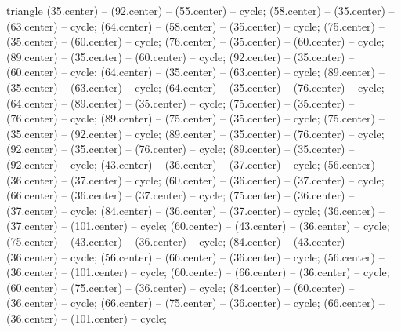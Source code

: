 \begin{pgfonlayer}{triangle}
 (35.center) -- (92.center) -- (55.center) -- cycle; 
 (58.center) -- (35.center) -- (63.center) -- cycle; 
 (64.center) -- (58.center) -- (35.center) -- cycle; 
 (75.center) -- (35.center) -- (60.center) -- cycle; 
 (76.center) -- (35.center) -- (60.center) -- cycle; 
 (89.center) -- (35.center) -- (60.center) -- cycle; 
 (92.center) -- (35.center) -- (60.center) -- cycle; 
 (64.center) -- (35.center) -- (63.center) -- cycle; 
 (89.center) -- (35.center) -- (63.center) -- cycle; 
 (64.center) -- (35.center) -- (76.center) -- cycle; 
 (64.center) -- (89.center) -- (35.center) -- cycle; 
 (75.center) -- (35.center) -- (76.center) -- cycle; 
 (89.center) -- (75.center) -- (35.center) -- cycle; 
 (75.center) -- (35.center) -- (92.center) -- cycle; 
 (89.center) -- (35.center) -- (76.center) -- cycle; 
 (92.center) -- (35.center) -- (76.center) -- cycle; 
 (89.center) -- (35.center) -- (92.center) -- cycle; 
 (43.center) -- (36.center) -- (37.center) -- cycle; 
 (56.center) -- (36.center) -- (37.center) -- cycle; 
 (60.center) -- (36.center) -- (37.center) -- cycle; 
 (66.center) -- (36.center) -- (37.center) -- cycle; 
 (75.center) -- (36.center) -- (37.center) -- cycle; 
 (84.center) -- (36.center) -- (37.center) -- cycle; 
 (36.center) -- (37.center) -- (101.center) -- cycle; 
 (60.center) -- (43.center) -- (36.center) -- cycle; 
 (75.center) -- (43.center) -- (36.center) -- cycle; 
 (84.center) -- (43.center) -- (36.center) -- cycle; 
 (56.center) -- (66.center) -- (36.center) -- cycle; 
 (56.center) -- (36.center) -- (101.center) -- cycle; 
 (60.center) -- (66.center) -- (36.center) -- cycle; 
 (60.center) -- (75.center) -- (36.center) -- cycle; 
 (84.center) -- (60.center) -- (36.center) -- cycle; 
 (66.center) -- (75.center) -- (36.center) -- cycle; 
 (66.center) -- (36.center) -- (101.center) -- cycle; 

\end{pgfonlayer}
